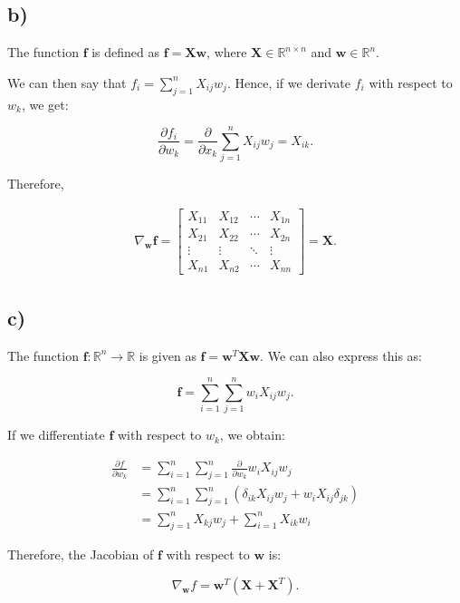 \documentclass[12pt,a4paper,oneside]{paper}
\begin{document}
\newpage
\subsection*{b)}

The function \( \bm{f} \) is defined as \( \bm{f} = \bm{Xw} \), where \( \bm{X} \in \mathbb{R}^{n \times n} \) and \( \bm{w} \in \mathbb{R}^n \).

We can then say that \( f_i = \sum_{j=1}^{n} X_{ij} w_j \). Hence, if we derivate \( f_i \) with respect to \( w_k \), we get:

\[
\frac{\partial f_i}{\partial w_k} = \frac{\partial}{\partial x_k } \sum_{j=1}^{n} X_{ij} w_j = X_{ik}.
\]

Therefore, 

\begin{align*}
\nabla_{\bm{w}} \bm{f} = \begin{bmatrix}
X_{11} & X_{12} & \cdots & X_{1n} \\
X_{21} & X_{22} & \cdots & X_{2n} \\
\vdots & \vdots & \ddots & \vdots \\
X_{n1} & X_{n2} & \cdots & X_{nn}
\end{bmatrix}
= \bm{X}.
\end{align*}

\newpage
\subsection*{c)}
The function \( \bm{f}: \mathbb{R}^{n} \rightarrow \mathbb{R} \) is given as \( \bm{f} = \bm{w}^T \bm{X} \bm{w} \). We can also express this as:

\[
\bm{f} = \sum_{i=1}^{n} \sum_{j=1}^{n} w_i X_{ij} w_j.
\]

If we differentiate \( \bm{f} \) with respect to \( w_k \), we obtain:

\begin{align*}
\frac{\partial f}{\partial w_k} &= \sum_{i=1}^{n} \sum_{j=1}^{n} \frac{\partial}{\partial w_k} w_i X_{ij} w_j \\
&= \sum_{i=1}^{n} \sum_{j=1}^{n} \left( \delta_{ik} X_{ij} w_j + w_i X_{ij} \delta_{jk} \right) \\
&= \sum_{j=1}^{n} X_{kj} w_j + \sum_{i=1}^{n} X_{ik} w_i
\end{align*}

Therefore, the Jacobian of \( \bm{f} \) with respect to \( \bm{w} \) is:

\[
\nabla_{\bm{w}} f = \bm{w}^T (\bm{X} + \bm{X}^T) .
\]
\end{document}
